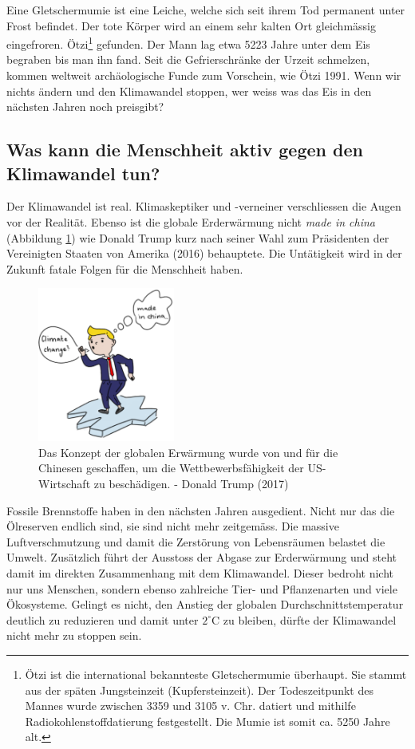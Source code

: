 \begin{refsection}
{Eine Gletschermumie ist eine Leiche, welche sich seit ihrem Tod permanent unter Frost befindet. Der tote Körper wird an einem sehr kalten Ort gleichmässig eingefroren.}
Ötzi\footnote{%
Ötzi ist die international bekannteste Gletschermumie überhaupt. Sie stammt aus der späten Jungsteinzeit (Kupfersteinzeit). Der Todeszeitpunkt des Mannes wurde zwischen 3359 und 3105 v. Chr. datiert und mithilfe Radiokohlenstoffdatierung festgestellt. Die Mumie ist somit ca. 5250 Jahre alt.}
gefunden. Der Mann lag etwa 5223 Jahre unter dem Eis begraben bis man ihn fand. Seit die Gefrierschränke der Urzeit schmelzen, kommen weltweit archäologische Funde zum Vorschein, wie Ötzi 1991. Wenn wir nichts ändern und den Klimawandel stoppen, wer weiss was das Eis in den nächsten Jahren noch preisgibt?


\subsection{Was kann die Menschheit aktiv gegen den Klimawandel tun?}
Der Klimawandel ist real. Klimaskeptiker und -verneiner verschliessen die Augen vor der Realität. Ebenso ist die globale Erderwärmung nicht \textit{made in china} (Abbildung \ref{DTrump}) wie Donald Trump kurz nach seiner Wahl zum Präsidenten der Vereinigten Staaten von Amerika (2016) behauptete. Die Untätigkeit  wird in der Zukunft fatale Folgen für die Menschheit haben.


\begin{figure}
\centering
\includegraphics[width=0.4\textwidth]{extrem/Trump.pdf}
\caption{Das Konzept der globalen Erwärmung wurde von und für die Chinesen geschaffen, um die Wettbewerbsfähigkeit der US-Wirtschaft zu beschädigen. - Donald Trump (2017)}
\label{DTrump}
\end{figure}



Fossile Brennstoffe haben in den nächsten Jahren ausgedient. Nicht nur das die Ölreserven endlich sind, sie sind nicht mehr zeitgemäss. Die massive Luftverschmutzung und damit die Zerstörung von Lebensräumen belastet die Umwelt. Zusätzlich führt der Ausstoss der Abgase zur Erderwärmung und steht damit im direkten Zusammenhang mit dem Klimawandel.
Dieser bedroht nicht nur uns Menschen, sondern ebenso zahlreiche Tier- und Pflanzenarten und viele Ökosysteme. Gelingt es nicht, den Anstieg der globalen Durchschnittstemperatur deutlich zu reduzieren und damit unter $2^{\circ}$C zu bleiben, dürfte der Klimawandel nicht mehr zu stoppen sein.


\end{refsection}
